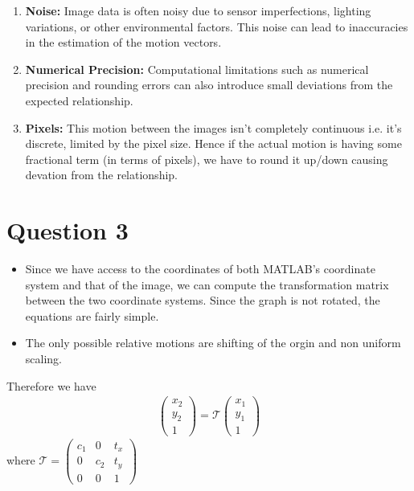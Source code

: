 \documentclass[12pt]{article}
\begin{document}
    \begin{enumerate}[itemsep=-0.25em]
        \item \textbf{Noise:} Image data is often noisy due to sensor imperfections, lighting variations, or other environmental factors. This noise can lead to inaccuracies in the estimation of the motion vectors.
        \item \textbf{Numerical Precision:} Computational limitations such as numerical precision and rounding errors can also introduce small deviations from the expected relationship.
        \item \textbf{Pixels:} This motion between the images isn’t completely continuous i.e. it’s discrete, limited by the pixel size. Hence if the actual motion is having some fractional term (in terms of pixels), we have to round it up/down causing devation from the relationship.
    \end{enumerate}

\section{Question 3}

    \begin{itemize}
        \item Since we have access to the coordinates of both MATLAB's coordinate system and that of the image, we can compute the 
        transformation matrix between the two coordinate systems. Since the graph is not rotated, the equations are fairly 
        simple.
        \item The only possible relative motions are shifting of the orgin and non uniform scaling.
    \end{itemize}

    Therefore we have 
    \begin{align}
        \begin{pmatrix}
            x_{2} \\
            y_{2} \\
            1
        \end{pmatrix}
        = \mathcal{T} 
        \begin{pmatrix}
            x_{1} \\
            y_{1} \\
            1
        \end{pmatrix}
    \end{align}
    where $\mathcal{T} = \begin{pmatrix}
                            c_{1} & 0 & t_{x} \\
                            0  & c_{2} & t_{y} \\
                            0 & 0 & 1
                        \end{pmatrix}$
\end{document}
